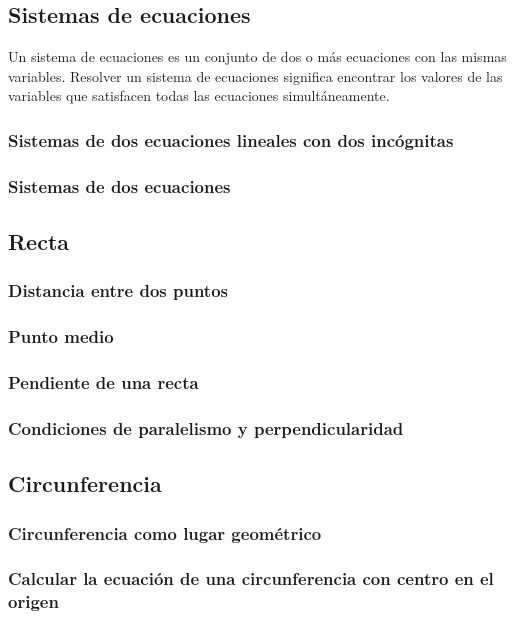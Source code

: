 \subsection{Sistemas de ecuaciones}

Un sistema de ecuaciones es un conjunto de dos o más ecuaciones con las mismas variables. Resolver un sistema de ecuaciones significa encontrar los valores de las variables que satisfacen todas las ecuaciones simultáneamente.

\subsubsection{Sistemas de dos ecuaciones lineales con dos incógnitas}
\subsubsection{Sistemas de dos ecuaciones}

\subsection{Recta}
\subsubsection{Distancia entre dos puntos}
\subsubsection{Punto medio}
\subsubsection{Pendiente de una recta}
\subsubsection{Condiciones de paralelismo y perpendicularidad}

\subsection{Circunferencia}
\subsubsection{Circunferencia como lugar geométrico}
\subsubsection{Calcular la ecuación de una circunferencia con centro en el origen}
